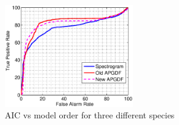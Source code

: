 \documentclass[a4paper]{article}
\begin{document}
 \begin{figure}[!ht]
	\centering
	\includegraphics[width=0.5\textwidth,height=7 cm] {gd2_3.eps}
	\caption{AIC vs model order for three different species }   
	\label{fig:gd2_3}
\end{figure} 
 
 
 
 
\end{document}
